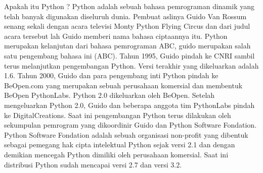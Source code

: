\noindent 
{\fontsize{14pt}{14pt}\selectfont Apakah itu Python ?\vspace{\baselineskip}
Python adalah sebuah bahasa pemrograman dinamik yang telah banyak\vspace{\baselineskip}
digunakan diseluruh dunia. Pembuat aslinya Guido Van Rossum senang sekali dengan\vspace{\baselineskip}
acara televisi Monty Python Flying Circus dan dari judul acara tersebut lah Guido\vspace{\baselineskip}
memberi nama bahasa ciptaannya itu. Python merupakan kelanjutan dari bahasa\vspace{\baselineskip}
pemrograman ABC, guido merupakan salah satu pengembang bahasa ini (ABC).\vspace{\baselineskip}
Tahun 1995, Guido pindah ke CNRI sambil terus melanjutkan pengembangan\vspace{\baselineskip}
Python. Versi terakhir yang dikeluarkan adalah 1.6. Tahun 2000, Guido dan para\vspace{\baselineskip}
pengembang inti Python pindah ke BeOpen.com yang merupakan sebuah perusahaan\vspace{\baselineskip}
komersial dan membentuk BeOpen PythonLabs. Python 2.0 dikeluarkan oleh BeOpen.\vspace{\baselineskip}
Setelah mengeluarkan Python 2.0, Guido dan beberapa anggota tim PythonLabs\vspace{\baselineskip}
pindah ke DigitalCreations.\vspace{\baselineskip}
Saat ini pengembangan Python terus dilakukan oleh sekumpulan pemrogram\vspace{\baselineskip}
yang dikoordinir Guido dan Python Software Fondation. Python Software Fondation\vspace{\baselineskip}
adalah sebuah organisasi non-profit yang dibentuk sebagai pemegang hak cipta\vspace{\baselineskip}
intelektual Python sejak versi 2.1 dan dengan demikian mencegah Python dimiliki oleh\vspace{\baselineskip}
perusahaan komersial. Saat ini distribusi Python sudah mencapai versi 2.7 dan versi 3.2. \\} \par
\noindent 
